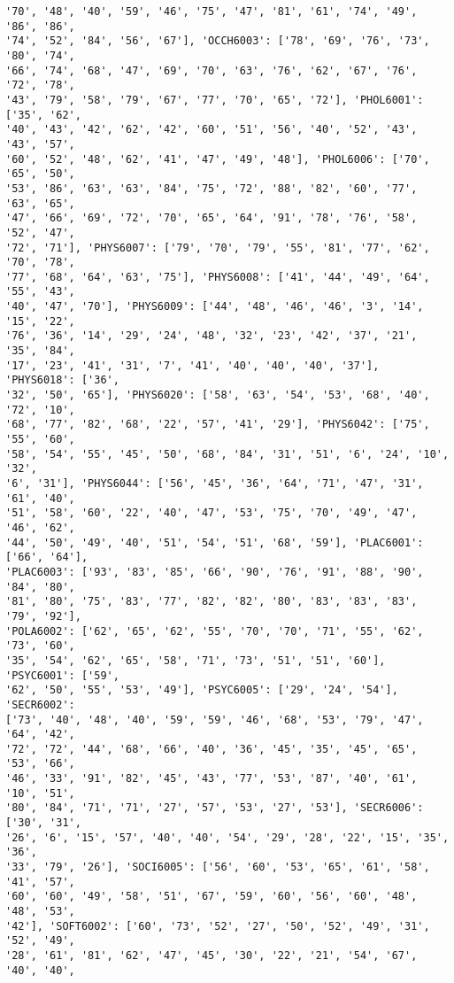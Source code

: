 \documentclass[11pt]{article}
\begin{document}
\begin{Verbatim}[commandchars=\\\{\}]
'70', '48', '40', '59', '46', '75', '47', '81', '61', '74', '49', '86', '86',
'74', '52', '84', '56', '67'], 'OCCH6003': ['78', '69', '76', '73', '80', '74',
'66', '74', '68', '47', '69', '70', '63', '76', '62', '67', '76', '72', '78',
'43', '79', '58', '79', '67', '77', '70', '65', '72'], 'PHOL6001': ['35', '62',
'40', '43', '42', '62', '42', '60', '51', '56', '40', '52', '43', '43', '57',
'60', '52', '48', '62', '41', '47', '49', '48'], 'PHOL6006': ['70', '65', '50',
'53', '86', '63', '63', '84', '75', '72', '88', '82', '60', '77', '63', '65',
'47', '66', '69', '72', '70', '65', '64', '91', '78', '76', '58', '52', '47',
'72', '71'], 'PHYS6007': ['79', '70', '79', '55', '81', '77', '62', '70', '78',
'77', '68', '64', '63', '75'], 'PHYS6008': ['41', '44', '49', '64', '55', '43',
'40', '47', '70'], 'PHYS6009': ['44', '48', '46', '46', '3', '14', '15', '22',
'76', '36', '14', '29', '24', '48', '32', '23', '42', '37', '21', '35', '84',
'17', '23', '41', '31', '7', '41', '40', '40', '40', '37'], 'PHYS6018': ['36',
'32', '50', '65'], 'PHYS6020': ['58', '63', '54', '53', '68', '40', '72', '10',
'68', '77', '82', '68', '22', '57', '41', '29'], 'PHYS6042': ['75', '55', '60',
'58', '54', '55', '45', '50', '68', '84', '31', '51', '6', '24', '10', '32',
'6', '31'], 'PHYS6044': ['56', '45', '36', '64', '71', '47', '31', '61', '40',
'51', '58', '60', '22', '40', '47', '53', '75', '70', '49', '47', '46', '62',
'44', '50', '49', '40', '51', '54', '51', '68', '59'], 'PLAC6001': ['66', '64'],
'PLAC6003': ['93', '83', '85', '66', '90', '76', '91', '88', '90', '84', '80',
'81', '80', '75', '83', '77', '82', '82', '80', '83', '83', '83', '79', '92'],
'POLA6002': ['62', '65', '62', '55', '70', '70', '71', '55', '62', '73', '60',
'35', '54', '62', '65', '58', '71', '73', '51', '51', '60'], 'PSYC6001': ['59',
'62', '50', '55', '53', '49'], 'PSYC6005': ['29', '24', '54'], 'SECR6002':
['73', '40', '48', '40', '59', '59', '46', '68', '53', '79', '47', '64', '42',
'72', '72', '44', '68', '66', '40', '36', '45', '35', '45', '65', '53', '66',
'46', '33', '91', '82', '45', '43', '77', '53', '87', '40', '61', '10', '51',
'80', '84', '71', '71', '27', '57', '53', '27', '53'], 'SECR6006': ['30', '31',
'26', '6', '15', '57', '40', '40', '54', '29', '28', '22', '15', '35', '36',
'33', '79', '26'], 'SOCI6005': ['56', '60', '53', '65', '61', '58', '41', '57',
'60', '60', '49', '58', '51', '67', '59', '60', '56', '60', '48', '48', '53',
'42'], 'SOFT6002': ['60', '73', '52', '27', '50', '52', '49', '31', '52', '49',
'28', '61', '81', '62', '47', '45', '30', '22', '21', '54', '67', '40', '40',

\end{Verbatim}
\end{document}

